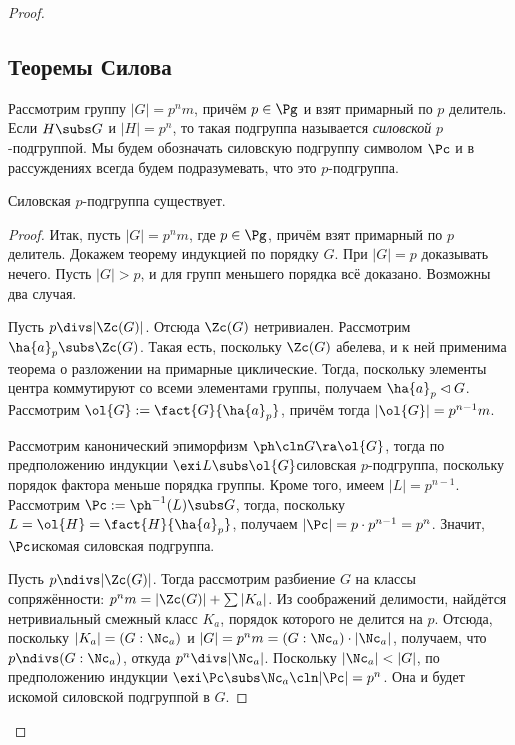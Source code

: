 \documentclass[a4paper]{article}
\begin{document}
\begin{proof}
\subsection{Теоремы Силова}

\begin{df}
Рассмотрим группу $|G| = p^nm$, причём $p \in \Pg$ и взят примарный  по $p$ делитель. Если $H \subs G$ и
$|H|=p^n$, то такая подгруппа называется \emph{силовской} $p$-подгруппой. Мы будем обозначать силовскую
подгруппу символом $\Pc$ и в рассуждениях всегда будем подразумевать, что это $p$-подгруппа.
\end{df}

\begin{theorem}
Силовская $p$-подгруппа существует.
\end{theorem}
\begin{proof}
Итак, пусть $|G|=p^nm$, где $p \in \Pg$, причём взят примарный по  $p$ делитель. Докажем теорему индукцией по
порядку $G$. При $|G| = p$ доказывать нечего. Пусть $|G| > p$, и для групп меньшего порядка всё доказано.
Возможны два случая.

 Пусть $p \divs |\Zc(G)|$. Отсюда $\Zc(G)$ нетривиален.  Рассмотрим $\ha{a}_p \subs \Zc(G)$. Такая
есть, поскольку $\Zc(G)$ абелева, и к ней применима теорема о разложении на примарные циклические. Тогда,
поскольку элементы центра коммутируют со всеми элементами группы, получаем $\ha{a}_p \lhd G$. Рассмотрим
$\ol{G} := \fact{G}{\ha{a}_p}$, причём тогда $|\ol{G}|=p^{n-1}m$.

Рассмотрим канонический эпиморфизм $\ph\cln G \ra \ol{G}$, тогда по  предположению индукции $\exi L \subs
\ol{G}$\т силовская $p$-подгруппа, поскольку порядок фактора меньше порядка группы. Кроме того, имеем $|L| =
p^{n-1}$. Рассмотрим $\Pc := \ph^{-1}(L) \subs G$, тогда, поскольку $L = \ol{H} = \fact{H}{\ha{a}_p}$,
получаем $|\Pc| = p \cdot p^{n-1} = p^n$. Значит, $\Pc$\т искомая силовская подгруппа.

 Пусть $p \ndivs |\Zc(G)|$. Тогда рассмотрим разбиение $G$ на  классы сопряжённости: $p^nm=|\Zc(G)| +
\sum |K_a|$. Из соображений делимости, найдётся нетривиальный смежный класс $K_a$, порядок которого не
делится на $p$. Отсюда, поскольку $|K_a|=(G:\Nc_a)$ и $|G| = p^nm = (G:\Nc_a) \cdot |\Nc_a|$, получаем, что
$p \ndivs (G:\Nc_a)$, откуда $p^n \divs |\Nc_a|$. Поскольку $|\Nc_a| < |G|$, по предположению индукции $\exi
\Pc \subs \Nc_a\cln |\Pc|=p^n$. Она и будет искомой силовской подгруппой в $G$.
\end{proof}


\end{proof}
\end{document}
